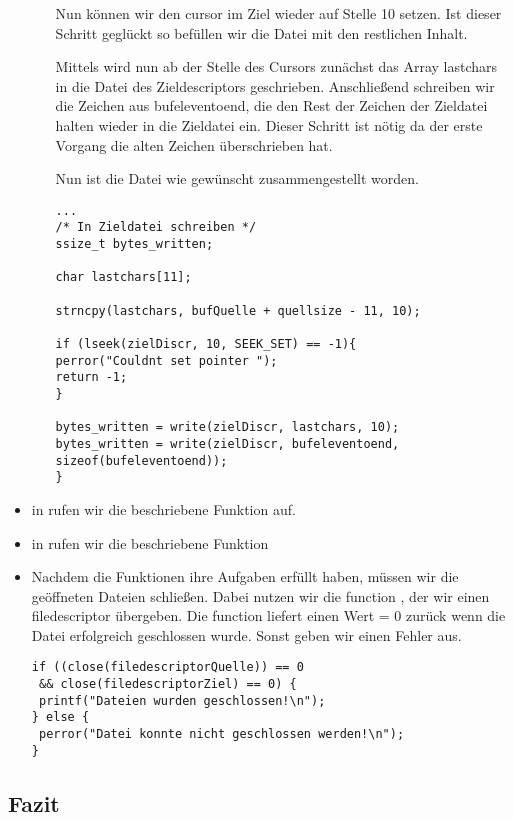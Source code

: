 \begin{itemize}
\begin{itemize}
	Nun können wir den cursor im Ziel wieder auf Stelle 10 setzen. Ist dieser
	Schritt geglückt so befüllen wir die Datei mit den restlichen Inhalt.

	Mittels  wird nun ab der Stelle des Cursors zunächst das
	Array lastchars in die Datei des Zieldescriptors geschrieben.
	Anschließend schreiben wir die Zeichen aus bufeleventoend, die den Rest
	der Zeichen der Zieldatei halten wieder in die Zieldatei ein. Dieser
	Schritt ist nötig da der erste  Vorgang die alten Zeichen
	überschrieben hat.

	Nun ist die Datei wie gewünscht zusammengestellt worden.

	\begin{lstlisting}
...
/* In Zieldatei schreiben */
ssize_t bytes_written;

char lastchars[11];

strncpy(lastchars, bufQuelle + quellsize - 11, 10);

if (lseek(zielDiscr, 10, SEEK_SET) == -1){
perror("Couldnt set pointer ");
return -1;
}

bytes_written = write(zielDiscr, lastchars, 10);
bytes_written = write(zielDiscr, bufeleventoend,
sizeof(bufeleventoend));
}
\end{lstlisting}

\end{itemize}

\item in  rufen wir die beschriebene Funktion  auf.
\item in  rufen wir die beschriebene Funktion 

\item Nachdem die Funktionen ihre Aufgaben erfüllt haben, müssen wir die geöffneten Dateien schließen.
Dabei nutzen wir die function , der wir einen filedescriptor übergeben. Die function
liefert einen Wert = 0 zurück wenn die Datei erfolgreich geschlossen wurde. Sonst geben wir einen Fehler aus.
\begin{lstlisting}
if ((close(filedescriptorQuelle)) == 0
 && close(filedescriptorZiel) == 0) {
 printf("Dateien wurden geschlossen!\n");
} else {
 perror("Datei konnte nicht geschlossen werden!\n");
}
\end{lstlisting}



\end{itemize} %



	\subsection{Fazit}

\newpage
